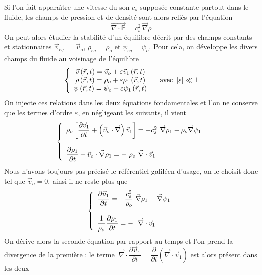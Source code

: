 Si l'on fait appara\^{\i}tre une vitesse du son $c_{s}$ supposée constante partout dans le
fluide, les champs de pression et de densit\'{e} sont alors reli\'{e}s par
l'\'{e}quation
\[
\overrightarrow{\nabla\cdot\mathbb{P}}=c_{s}^{2}\, \vec{\nabla}\rho
\]
On peut alors \'{e}tudier la stabilit\'{e} d'un \'{e}quilibre d\'{e}crit par
des champs constants et stationnaires $\vec{v}_{eq}=$
$\vec{v}_{o}$, $\rho_{eq}=\rho_{o}$ et $\psi_{eq}=\psi_{o}$. Pour cela, on
d\'{e}veloppe les divers champs du fluide au voisinage de l'\'{e}quilibre%
\[
\left\{
\begin{array}
[c]{c}%
\vec{v}\left(  \vec{r},t\right)  =\vec{v}_{o}+\varepsilon
\vec{v}_{1}\left(  \vec{r},t\right)  \\
\rho\left(  \vec{r},t\right)  =\rho_{o}+\varepsilon\rho_{1}\left(
\vec{r},t\right)  \\
\psi\left(  \vec{r},t\right)  =\psi_{o}+\varepsilon\psi_{1}\left(
\vec{r},t\right)
\end{array}
\right.  \ \ \ \text{avec }\left\vert \varepsilon\right\vert \ll1
\]
On injecte ces relations dans les deux \'{e}quations fondamentales et l'on ne
conserve que les termes d'ordre $\varepsilon$, en n\'{e}gligeant les suivants,
il vient%
\[
\left\{
\begin{array}
[c]{l}%
\rho_{o}\left[  \dfrac{\partial\vec{v}_{1}}{\partial t}+\left(
\vec{v}_{o}\cdot\vec{\nabla}\right)  \vec{v}_{1}\right]  =-c_{s}%
^{2}\ \vec{\nabla}\rho_{1}-\rho_{o}\vec{\nabla}\psi_{1}\\
\\
\dfrac{\partial\rho_{1}}{\partial t}+\vec{v}_{o}\cdot\vec{\nabla}\rho
_{1}=-\ \rho_{o}\ \vec{\nabla}\cdot\vec{v}_{1}%
\end{array}
\right.
\]
Nous n'avons toujours pas pr\'{e}cis\'{e} le r\'{e}f\'{e}rentiel galil\'{e}en
d'usage, on le choisit donc tel que $\vec{v}_{o}=0$, ainsi il ne
reste plus que%
\[
\left\{
\begin{array}
[c]{l}%
\dfrac{\partial\vec{v}_{1}}{\partial t}=-\dfrac{c_{s}^{2}}{\rho_{o}%
}\ \vec{\nabla}\rho_{1}-\vec{\nabla}\psi_{1}\\
\\
\dfrac{1}{\rho_{o}}\dfrac{\partial\rho_{1}}{\partial t}=-\ \ \vec{\nabla
}\cdot\vec{v}_{1}%
\end{array}
\right.
\]
On d\'{e}rive alors la seconde \'{e}quation par rapport au temps et l'on prend
la divergence de la premi\`{e}re : le terme $\ \vec{\nabla}\cdot\dfrac
{\partial\vec{v}_{1}}{\partial t}=\dfrac{\partial}{\partial t}\left(
\vec{\nabla}\cdot\vec{v}_{1}\right)  $ est alors pr\'{e}sent dans les deux
